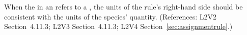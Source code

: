 When the  in an \AssignmentRule refers to a \Species, the
units of the rule's right-hand side should be consistent with the units of
the species' quantity.  (References: L2V2 Section~4.11.3;
L2V3 Section~4.11.3; L2V4 Section~\ref{sec:assignmentrule}.)
